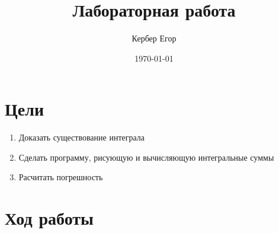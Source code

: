 \documentclass[12pt, a4paper]{article}
\title{\textbf{Лабораторная работа}}
\author{Кербер Егор}
\date{\today}
\begin{document}
\maketitle

\tableofcontents
\section*{Цели}
\begin{enumerate}
    \item Доказать существование интеграла
    \item Сделать программу, рисующую и вычисляющую интегральные суммы
    \item Расчитать погрешность
\end{enumerate}
\newpage
\section{Ход работы}
\end{document}
